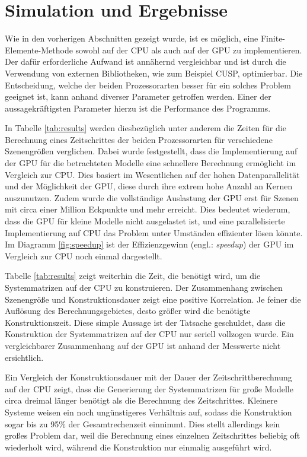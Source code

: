 \documentclass{article}
\begin{document}
  \section{Simulation und Ergebnisse} %
  \label{sec:simulation_und_ergebnisse}

    Wie in den vorherigen Abschnitten gezeigt wurde, ist es möglich, eine Finite-Elemente-Methode sowohl auf der CPU als auch auf der GPU zu implementieren.
    Der dafür erforderliche Aufwand ist annähernd vergleichbar und ist durch die Verwendung von externen Bibliotheken, wie zum Beispiel CUSP, optimierbar.
    Die Entscheidung, welche der beiden Prozessorarten besser für ein solches Problem geeignet ist, kann anhand diverser Parameter getroffen werden.
    Einer der aussagekräftigsten Parameter hierzu ist die Performance des Programms.

    In Tabelle \ref{tab:results} werden diesbezüglich unter anderem die Zeiten für die Berechnung eines Zeitschrittes der beiden Prozessorarten für verschiedene Szenengrößen verglichen.
    Dabei wurde festgestellt, dass die Implementierung auf der GPU für die betrachteten Modelle eine schnellere Berechnung ermöglicht im Vergleich zur CPU.
    Dies basiert im Wesentlichen auf der hohen Datenparallelität und der Möglichkeit der GPU, diese durch ihre extrem hohe Anzahl an Kernen auszunutzen.
    Zudem wurde die vollständige Auslastung der GPU erst für Szenen mit circa einer Million Eckpunkte und mehr erreicht.
    Dies bedeutet wiederum, dass die GPU für kleine Modelle nicht ausgelastet ist, und eine parallelisierte Implementierung auf CPU das Problem unter Umständen effizienter lösen könnte.
    Im Diagramm \ref{fig:speedup} ist der Effizienzgewinn (engl.: \textit{speedup}) der GPU im Vergleich zur CPU noch einmal dargestellt.

    Tabelle \ref{tab:results} zeigt weiterhin die Zeit, die benötigt wird, um die Systemmatrizen auf der CPU zu konstruieren.
    Der Zusammenhang zwischen Szenengröße und Konstruktionsdauer zeigt eine positive Korrelation.
    Je feiner die Auflösung des Berechnungsgebietes, desto größer wird die benötigte Konstruktionszeit.
    Diese simple Aussage ist der Tatsache geschuldet, dass die Konstruktion der Systemmatrizen auf der CPU nur seriell vollzogen wurde.
    Ein vergleichbarer Zusammenhang auf der GPU ist anhand der Messwerte nicht ersichtlich.

    Ein Vergleich der Konstruktionsdauer mit der Dauer der Zeitschrittberechnung auf der CPU zeigt, dass die Generierung der Systemmatrizen für große Modelle circa dreimal länger benötigt als die Berechnung des Zeitschrittes.
    Kleinere Systeme weisen ein noch ungünstigeres Verhältnis auf, sodass die Konstruktion sogar bis zu 95\% der Gesamtrechenzeit einnimmt.
    Dies stellt allerdings kein großes Problem dar, weil die Berechnung eines einzelnen Zeitschrittes beliebig oft wiederholt wird, während die Konstruktion nur einmalig ausgeführt wird.
\end{document}
